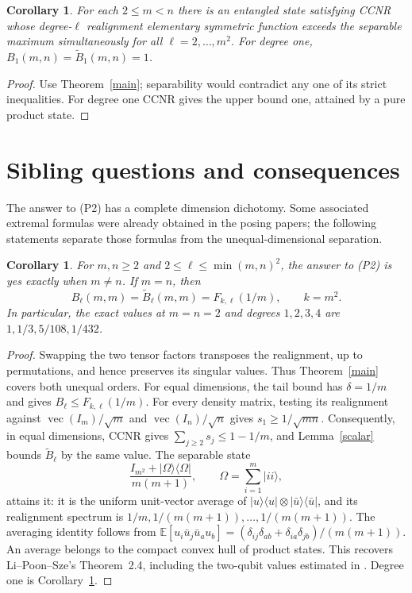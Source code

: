 \documentclass[11pt]{article}
\newtheorem{corollary}[theorem]{Corollary}
\newcommand{\F}{F_{k,\ell}}
\begin{document}
\begin{corollary}\label{entangled}
For each $2\le m<n$ there is an entangled state satisfying CCNR whose
degree-$\ell$ realignment elementary symmetric function exceeds the
separable maximum simultaneously for all $\ell=2,\ldots,m^2$.
For degree one, $B_1(m,n)=\widetilde B_1(m,n)=1$.
\end{corollary}
\begin{proof}
Use Theorem~\ref{main}; separability would contradict any one of its strict
inequalities. For degree one CCNR gives the upper bound one, attained by
a pure product state.
\end{proof}

\section{Sibling questions and consequences}
The answer to (P2) has a complete dimension dichotomy. Some associated
extremal formulas were already obtained in the posing papers; the following
statements separate those formulas from the unequal-dimensional separation.

\begin{corollary}\label{classification}
For $m,n\ge2$ and $2\le\ell\le\min(m,n)^2$, the answer to (P2) is
yes exactly when $m\ne n$. If $m=n$, then
\[
 B_\ell(m,m)=\widetilde B_\ell(m,m)
 =\F(1/m),\qquad k=m^2.
\]
In particular, the exact values at $m=n=2$ and degrees $1,2,3,4$ are
$1,1/3,5/108,1/432$.
\end{corollary}
\begin{proof}
Swapping the two tensor factors transposes the realignment, up to
permutations, and hence preserves its singular values. Thus
Theorem~\ref{main} covers both unequal orders.
For equal dimensions, the tail bound has $\delta=1/m$ and gives
$B_\ell\le\F(1/m)$. For every density matrix, testing its realignment
against $\operatorname{vec}(I_m)/\sqrt m$ and
$\operatorname{vec}(I_n)/\sqrt n$ gives $s_1\ge1/\sqrt{mn}$.
Consequently, in equal dimensions, CCNR gives
$\sum_{j\ge2}s_j\le1-1/m$, and Lemma~\ref{scalar} bounds
$\widetilde B_\ell$ by the same value.
The separable state
\[
 \frac{I_{m^2}+|\Omega\rangle\langle\Omega|}{m(m+1)},
 \qquad \Omega=\sum_{i=1}^m|ii\rangle,
\]
attains it: it is the uniform unit-vector average of
$|u\rangle\langle u|\otimes|\bar u\rangle\langle\bar u|$, and its
realignment spectrum is $1/m,1/(m(m+1)),\ldots,1/(m(m+1))$.
The averaging identity follows from
$\mathbb E[u_i\bar u_j\bar u_a u_b]
=(\delta_{ij}\delta_{ab}+\delta_{ia}\delta_{jb})/(m(m+1))$.
An average belongs to the compact convex hull of product states.
This recovers Li--Poon--Sze's Theorem~2.4, including the two-qubit values
estimated in \cite[Table~1]{LAS}. Degree one is Corollary~\ref{entangled}.
\end{proof}
\end{document}
